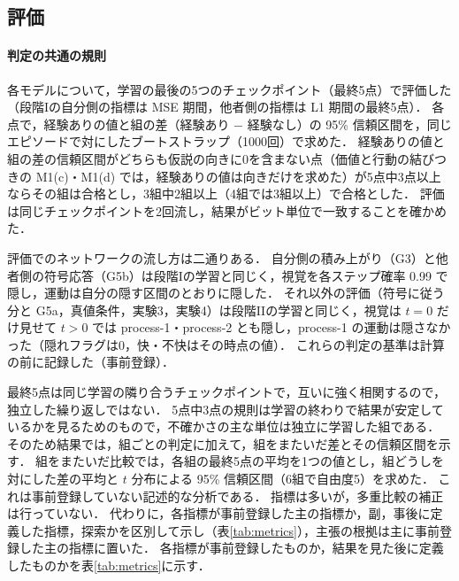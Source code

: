 \subsection{評価}\label{sec:evaluation}

\paragraph{判定の共通の規則}
各モデルについて，学習の最後の5つのチェックポイント（最終5点）で評価した（段階Iの自分側の指標は MSE 期間，他者側の指標は L1 期間の最終5点）．
各点で，経験ありの値と組の差（経験あり $-$ 経験なし）の 95\% 信頼区間を，同じエピソードで対にしたブートストラップ（1000回）で求めた．
経験ありの値と組の差の信頼区間がどちらも仮説の向きに0を含まない点（価値と行動の結びつきの M1(c)・M1(d) では，経験ありの値は向きだけを求めた）が5点中3点以上ならその組は合格とし，3組中2組以上（4組では3組以上）で合格とした．
評価は同じチェックポイントを2回流し，結果がビット単位で一致することを確かめた．

評価でのネットワークの流し方は二通りある．
自分側の積み上がり（G3）と他者側の符号応答（G5b）は段階Iの学習と同じく，視覚を各ステップ確率 0.99 で隠し，運動は自分の隠す区間のとおりに隠した．
それ以外の評価（符号に従う分と G5a，真値条件，実験3，実験4）は段階IIの学習と同じく，視覚は $t=0$ だけ見せて $t>0$ では process-1・process-2 とも隠し，process-1 の運動は隠さなかった（隠れフラグは0，快・不快はその時点の値）．
これらの判定の基準は計算の前に記録した（事前登録）．

最終5点は同じ学習の隣り合うチェックポイントで，互いに強く相関するので，独立した繰り返しではない．
5点中3点の規則は学習の終わりで結果が安定しているかを見るためのもので，不確かさの主な単位は独立に学習した組である．
そのため結果では，組ごとの判定に加えて，組をまたいだ差とその信頼区間を示す．
組をまたいだ比較では，各組の最終5点の平均を1つの値とし，組どうしを対にした差の平均と $t$ 分布による 95\% 信頼区間（6組で自由度5）を求めた．
これは事前登録していない記述的な分析である．
指標は多いが，多重比較の補正は行っていない．
代わりに，各指標が事前登録した主の指標か，副，事後に定義した指標，探索かを区別して示し（表\ref{tab:metrics}），主張の根拠は主に事前登録した主の指標に置いた．
各指標が事前登録したものか，結果を見た後に定義したものかを表\ref{tab:metrics}に示す．

\begin{table}[t]
  \centering
  \small
  \caption{指標の定義と事前登録の区別}
  \label{tab:metrics}
  
\end{table}

